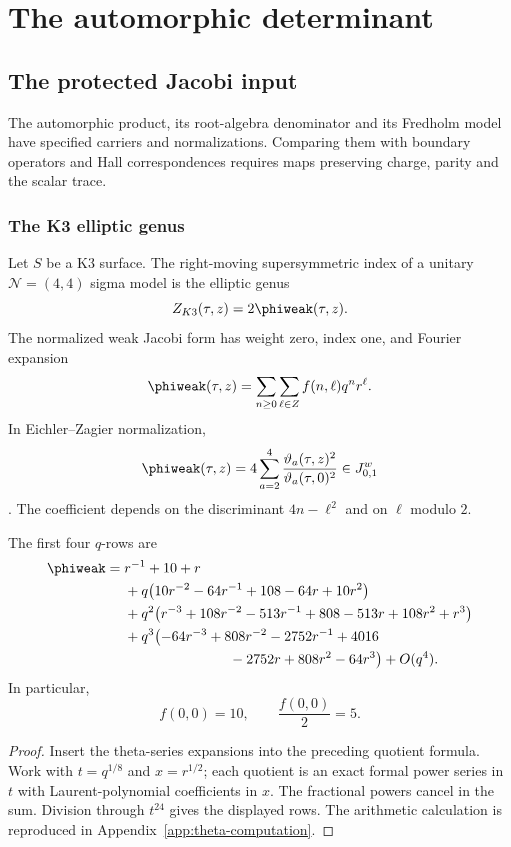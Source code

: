 \part{The automorphic determinant}

\chapter{The protected Jacobi input}
\begin{summarybox}
The automorphic product, its root-algebra denominator and its Fredholm model have specified carriers and normalizations. Comparing them with boundary operators and Hall correspondences requires maps preserving charge, parity and the scalar trace.
\end{summarybox}

\section{The K3 elliptic genus}
Let $S$ be a K3 surface. The right-moving supersymmetric index of a unitary $\mathcal N=(4,4)$ sigma model is the elliptic genus
\[
 Z_{K3}(\tau,z)=2\phiweak(\tau,z).
\]
The normalized weak Jacobi form has weight zero, index one, and Fourier expansion
\[
 \phiweak(\tau,z)=\sum_{n\ge0}\sum_{\ell\in\Z}f(n,\ell)q^nr^\ell.
\]
In Eichler--Zagier normalization,
\[
 \phiweak(\tau,z)=4\sum_{a=2}^{4}
 \frac{\vartheta_a(\tau,z)^2}{\vartheta_a(\tau,0)^2}
 \in J^{\mathrm w}_{0,1}
\]
\cite{EZ}. The coefficient depends on the discriminant $4n-\ell^2$ and on $\ell$ modulo $2$.

\begin{theorem}
The first four $q$-rows are
\[
\begin{aligned}
\phiweak={}&r^{-1}+10+r\\
&+q\bigl(10r^{-2}-64r^{-1}+108-64r+10r^2\bigr)\\
&+q^2\bigl(r^{-3}+108r^{-2}-513r^{-1}+808-513r+108r^2+r^3\bigr)\\
&+q^3\bigl(-64r^{-3}+808r^{-2}-2752r^{-1}+4016\\
&\hspace{7.5em}{}-2752r+808r^2-64r^3\bigr)+O(q^4).
\end{aligned}
\]
In particular,
\[
 f(0,0)=10,
 \qquad \frac{f(0,0)}2=5.
\]
\end{theorem}
\begin{proof}
Insert the theta-series expansions into the preceding quotient formula. Work with $t=q^{1/8}$ and $x=r^{1/2}$; each quotient is an exact formal power series in $t$ with Laurent-polynomial coefficients in $x$. The fractional powers cancel in the sum. Division through $t^{24}$ gives the displayed rows. The arithmetic calculation is reproduced in Appendix~\ref{app:theta-computation}.
\end{proof}

